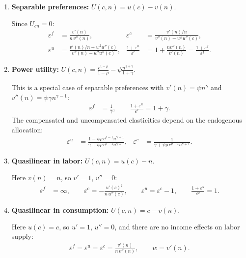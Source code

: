 \documentclass[12pt,a4paper]{article}
\theoremstyle{definition}
\theoremstyle{plain}
\theoremstyle{remark}
\begin{document}
\begin{enumerate}[label=\textbf{Case \arabic*.}, leftmargin=*, itemsep=12pt]

\item \textbf{Separable preferences:} $U(c,n) = u(c) - v(n)$.

Since $U_{cn} = 0$:
\begin{align*}
  \varepsilon^f &= \frac{v'(n)}{n \, v''(n)}, &
  \varepsilon^c &= \frac{v'(n)/n}{v''(n) - w^2 u''(c)}, \\
  \varepsilon^u &= \frac{v'(n)/n + w^2 u''(c)}{v''(n) - w^2 u''(c)}, &
  \frac{1 + \varepsilon^u}{\varepsilon^c} &= 1 + \frac{n v''(n)}{v'(n)} = \frac{1 + \varepsilon^f}{\varepsilon^f}.
\end{align*}

\item \textbf{Power utility:} $U(c,n) = \frac{c^{1-\rho}}{1-\rho} - \psi \frac{n^{1+\gamma}}{1+\gamma}$.

This is a special case of separable preferences with $v'(n) = \psi n^\gamma$ and $v''(n) = \psi \gamma n^{\gamma - 1}$:
\begin{align*}
  \varepsilon^f &= \frac{1}{\gamma}, \qquad
  \frac{1 + \varepsilon^u}{\varepsilon^c} = 1 + \gamma.
\end{align*}
The compensated and uncompensated elasticities depend on the endogenous allocation:
\begin{align*}
  \varepsilon^u &= \frac{1 - \psi \rho \, c^{\rho-1} n^{\gamma+1}}{\gamma + \psi \rho \, c^{\rho-1} n^{\gamma+1}}, &
  \varepsilon^c &= \frac{1}{\gamma + \psi \rho \, c^{\rho-1} n^{\gamma+1}}.
\end{align*}

\item \textbf{Quasilinear in labor:} $U(c,n) = u(c) - n$.

Here $v(n) = n$, so $v' = 1$, $v'' = 0$:
\begin{align*}
  \varepsilon^f &= \infty, \qquad
  \varepsilon^c = -\frac{u'(c)^2}{n \, u''(c)}, \qquad
  \varepsilon^u = \varepsilon^c - 1, \qquad
  \frac{1 + \varepsilon^u}{\varepsilon^c} = 1.
\end{align*}

\item \textbf{Quasilinear in consumption:} $U(c,n) = c - v(n)$.

Here $u(c) = c$, so $u' = 1$, $u'' = 0$, and there are no income effects on labor supply:
\begin{align*}
  \varepsilon^f = \varepsilon^u = \varepsilon^c = \frac{v'(n)}{n \, v''(n)}, \qquad w = v'(n).
\end{align*}
\end{enumerate}
\end{document}
